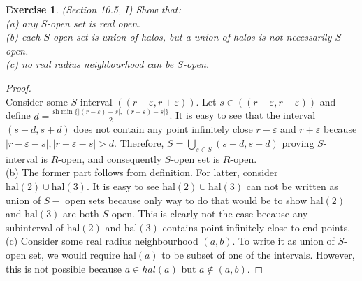 \documentclass[a4paper, 11pt, openany]{book}
\theoremstyle{plain}
\newtheorem{exercise}{Exercise}[chapter]
\theoremstyle{plain}
\newcommand{\ep}{\varepsilon}
\newcommand{\hal}{\text{hal}}
\newcommand{\sh}{\text{sh}}
\begin{document}
    \begin{exercise}
      (Section 10.5, I)
      Show that: \\
      (a) any $S$-open set is real open. \\
      (b) each $S$-open set is union of halos, but a union of halos is not necessarily $S$-open. \\
      (c) no real radius neighbourhood can be $S$-open.
    \end{exercise}
    \begin{proof} $ $ \\
      Consider some $S$-interval $((r-\ep,r+\ep))$. Let $s \in ((r-\ep, r+\ep))$ and define $d=\frac{\sh \min \{|(r-\ep)-s|, |(r+\ep)-s|\}}{2} $. It is easy to see that the interval $(s-d, s+d)$ does not contain any point infinitely close $r-\ep$ and $r+\ep$ because $|r-\ep-s|, |r+\ep-s|>d$. Therefore, $S=\bigcup_{s \in S} (s-d, s+d)$ proving $S$-interval is $R$-open, and consequently $S$-open set is $R$-open. \\

      (b) The former part follows from definition. For latter, consider $\hal(2) \cup \hal(3)$. It is easy to see $\hal(2) \cup \hal(3)$ can not be written as union of $S-$ open sets because only way to do that would be to show $\hal(2)$ and $\hal(3)$ are both $S$-open. This is clearly not the case because any subinterval of $\hal(2)$ and $\hal(3)$ contains point infinitely close to end points. \\

      (c) Consider some real radius neighbourhood $(a,b)$. To write it as union of $S$-open set, we would require $\hal(a)$ to be subset of one of the intervals. However, this is not possible because $a \in hal(a)$ but $a \notin (a,b)$.
    \end{proof}
\end{document}
